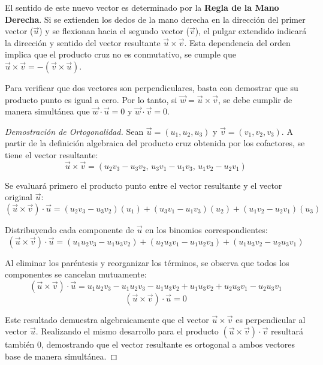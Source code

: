 El sentido de este nuevo vector es determinado por la \textbf{Regla de la Mano Derecha}. Si se extienden los dedos de la mano derecha en la dirección del primer vector ($\vec{u}$) y se flexionan hacia el segundo vector ($\vec{v}$), el pulgar extendido indicará la dirección y sentido del vector resultante $\vec{u} \times \vec{v}$. Esta dependencia del orden implica que el producto cruz no es conmutativo, se cumple que $\vec{u} \times \vec{v} = -(\vec{v} \times \vec{u})$.


\begin{center}
\begin{minipage}{.9\textwidth}
\centering
\begingroup\shorthandoff{>}
\def\manoPrimero{\vec{u}}\def\manoSegundo{\vec{v}}\def\manoResultado{\vec{u}\times\vec{v}}

\endgroup
\end{minipage}
\end{center}


Para verificar que dos vectores son perpendiculares, basta con demostrar que su producto punto es igual a cero. Por lo tanto, si $\vec{w} = \vec{u} \times \vec{v}$, se debe cumplir de manera simultánea que $\vec{w} \cdot \vec{u} = 0$ y $\vec{w} \cdot \vec{v} = 0$.

\begin{proof}[Demostración de Ortogonalidad]
Sean $\vec{u} = (u_1, u_2, u_3)$ y $\vec{v} = (v_1, v_2, v_3)$. A partir de la definición algebraica del producto cruz obtenida por los cofactores, se tiene el vector resultante:
\[
\vec{u} \times \vec{v} = (u_2v_3 - u_3v_2, \, u_3v_1 - u_1v_3, \, u_1v_2 - u_2v_1)
\]

Se evaluará primero el producto punto entre el vector resultante y el vector original $\vec{u}$:
\[
(\vec{u} \times \vec{v}) \cdot \vec{u} = (u_2v_3 - u_3v_2)(u_1) + (u_3v_1 - u_1v_3)(u_2) + (u_1v_2 - u_2v_1)(u_3)
\]

Distribuyendo cada componente de $\vec{u}$ en los binomios correspondientes:
\[
(\vec{u} \times \vec{v}) \cdot \vec{u} = (u_1u_2v_3 - u_1u_3v_2) + (u_2u_3v_1 - u_1u_2v_3) + (u_1u_3v_2 - u_2u_3v_1)
\]

Al eliminar los paréntesis y reorganizar los términos, se observa que todos los componentes se cancelan mutuamente:
\[
(\vec{u} \times \vec{v}) \cdot \vec{u} = u_1u_2v_3 - u_1u_2v_3 - u_1u_3v_2 + u_1u_3v_2 + u_2u_3v_1 - u_2u_3v_1
\]
\[
(\vec{u} \times \vec{v}) \cdot \vec{u} = 0
\]

Este resultado demuestra algebraicamente que el vector $\vec{u} \times \vec{v}$ es perpendicular al vector $\vec{u}$. Realizando el mismo desarrollo para el producto $(\vec{u} \times \vec{v}) \cdot \vec{v}$ resultará también $0$, demostrando que el vector resultante es ortogonal a ambos vectores base de manera simultánea.
\end{proof}

